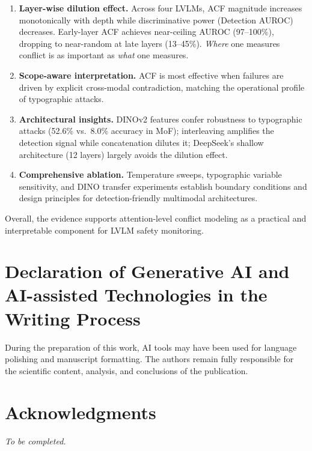 \documentclass[preprint,12pt]{elsarticle}
\begin{document}
\begin{enumerate}[leftmargin=*]
    \item \textbf{Layer-wise dilution effect.} Across four LVLMs, ACF magnitude increases monotonically with depth while discriminative power (Detection AUROC) decreases. Early-layer ACF achieves near-ceiling AUROC (97--100\%), dropping to near-random at late layers (13--45\%). \emph{Where} one measures conflict is as important as \emph{what} one measures.
    \item \textbf{Scope-aware interpretation.} ACF is most effective when failures are driven by explicit cross-modal contradiction, matching the operational profile of typographic attacks.
    \item \textbf{Architectural insights.} DINOv2 features confer robustness to typographic attacks (52.6\% vs.\ 8.0\% accuracy in MoF); interleaving amplifies the detection signal while concatenation dilutes it; DeepSeek's shallow architecture (12 layers) largely avoids the dilution effect.
    \item \textbf{Comprehensive ablation.} Temperature sweeps, typographic variable sensitivity, and DINO transfer experiments establish boundary conditions and design principles for detection-friendly multimodal architectures.
\end{enumerate}

Overall, the evidence supports attention-level conflict modeling as a practical and interpretable component for LVLM safety monitoring.


\section*{Declaration of Generative AI and AI-assisted Technologies in the Writing Process}
During the preparation of this work, AI tools may have been used for language polishing and manuscript formatting. The authors remain fully responsible for the scientific content, analysis, and conclusions of the publication.

\section*{Acknowledgments}
\textit{To be completed.}




\end{document}

